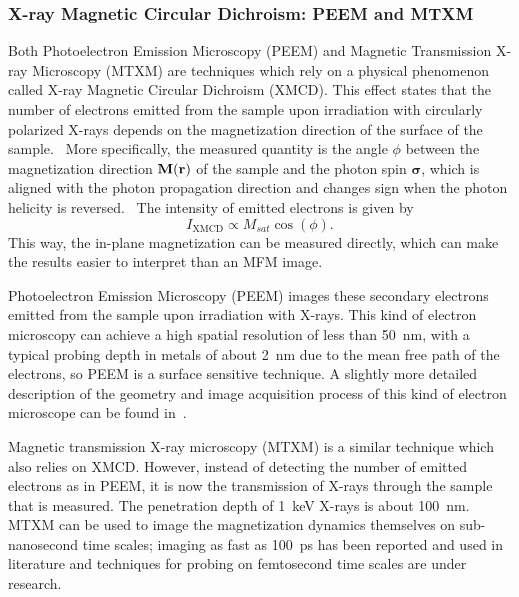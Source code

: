\documentclass[11pt,a4paper,english]{article}
\renewcommand{\vec}[1]{\boldsymbol{#1}}
\begin{document}
\subsubsection{X-ray Magnetic Circular Dichroism: PEEM and MTXM}
Both Photoelectron Emission Microscopy (PEEM) and Magnetic Transmission X-ray Microscopy (MTXM) are techniques which rely on a physical phenomenon called X-ray Magnetic Circular Dichroism (XMCD). This effect states that the number of electrons emitted from the sample upon irradiation with circularly polarized X-rays depends on the magnetization direction of the surface of the sample.~\cite{NML_Carlton} More specifically, the measured quantity is the angle $\phi$ between the magnetization direction $\vb{M(\vb{r})}$ of the sample and the photon spin $\vec{\sigma}$, which is aligned with the photon propagation direction and changes sign when the photon helicity is reversed.~\cite{PEEM} The intensity of emitted electrons is given by
\begin{equation}
    I_{\mathrm{XMCD}} \propto M_{sat} \cos(\phi) \mathrm{.}
    \label{eq:XMCD}
\end{equation} 
This way, the in-plane magnetization can be measured directly, which can make the results easier to interpret than an MFM image. \par

Photoelectron Emission Microscopy (PEEM) images these secondary electrons emitted from the sample upon irradiation with X-rays. This kind of electron microscopy can achieve a high spatial resolution of less than \SI{50}{\nano\metre}, with a typical probing depth in metals of about \SI{2}{\nano\metre} due to the mean free path of the electrons, so PEEM is a surface sensitive technique. A slightly more detailed description of the geometry and image acquisition process of this kind of electron microscope can be found in~\cite{PEEM}. \par 

Magnetic transmission X-ray microscopy (MTXM) is a similar technique which also relies on XMCD. However, instead of detecting the number of emitted electrons as in PEEM, it is now the transmission of X-rays through the sample that is measured. The penetration depth of \SI{1}{\kilo\electronvolt} X-rays is about \SI{100}{\nano\metre}.~\cite{Imaging_MTXM} MTXM can be used to image the magnetization dynamics themselves on sub-nanosecond time scales; imaging as fast as \SI{100}{\pico\second} has been reported and used in literature and techniques for probing on femtosecond time scales are under research.~\cite{SubnanosecondPropagation_AnisotropyChains, Imaging_MTXM} \par
\end{document}
